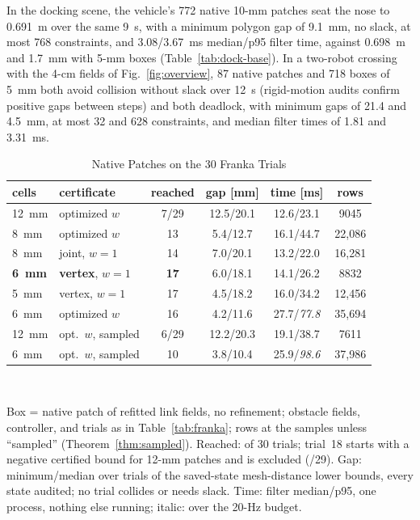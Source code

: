 \documentclass[journal]{IEEEtran}
\theoremstyle{definition}
\begin{document}
In the docking scene, the vehicle's 772 native 10-mm patches seat the nose to 0.691~m over the same
9~s, with a minimum polygon gap of 9.1~mm, no slack, at most 768 constraints, and 3.08/3.67~ms
median/p95 filter time, against 0.698~m and 1.7~mm with 5-mm boxes (Table~\ref{tab:dock-base}).
In a two-robot crossing with the 4-cm fields of Fig.~\ref{fig:overview}, 87 native patches and 718
boxes of 5~mm both avoid collision without slack over 12~s (rigid-motion audits confirm positive gaps
between steps) and both deadlock, with minimum gaps of 21.4 and 4.5~mm, at most 32 and 628
constraints, and median filter times of 1.81 and 3.31~ms.

\begin{table}[t]
\caption{Native Patches on the 30 Franka Trials}
\label{tab:native}
\centering\footnotesize
\setlength{\tabcolsep}{1.8pt}
\begin{tabular}{llcccc}
\toprule
cells & certificate & reached & gap [mm] & time [ms] & rows\\
\midrule
12~mm & optimized $w$ & 7/29 & 12.5/20.1 & 12.6/23.1 & 9045\\
8~mm & optimized $w$ & 13 & 5.4/12.7 & 16.1/44.7 & 22{,}086\\
8~mm & joint, $w=1$ & 14 & 7.0/20.1 & 13.2/22.0 & 16{,}281\\
\textbf{6~mm} & \textbf{vertex}, $w=1$ & \textbf{17} & 6.0/18.1 & 14.1/26.2 & 8832\\
5~mm & vertex, $w=1$ & 17 & 4.5/18.2 & 16.0/34.2 & 12{,}456\\
6~mm & optimized $w$ & 16 & 4.2/11.6 & 27.7/\textit{77.8} & 35{,}694\\
12~mm & opt.\ $w$, sampled & 6/29 & 12.2/20.3 & 19.1/38.7 & 7611\\
6~mm & opt.\ $w$, sampled & 10 & 3.8/10.4 & 25.9/\textit{98.6} & 37{,}986\\
\bottomrule
\end{tabular}
\\[3pt]
\parbox{\columnwidth}{\footnotesize Box = native patch of refitted link fields, no refinement; obstacle
fields, controller, and trials as in Table~\ref{tab:franka}; rows at the samples unless ``sampled''
(Theorem~\ref{thm:sampled}). Reached: of 30 trials; trial~18 starts with a negative certified bound for
12-mm patches and is excluded (/29). Gap: minimum/median over trials of the saved-state mesh-distance
lower bounds, every state audited; no trial collides or needs slack. Time: filter median/p95, one
process, nothing else running; italic: over the 20-Hz budget.}
\end{table}
\end{document}
